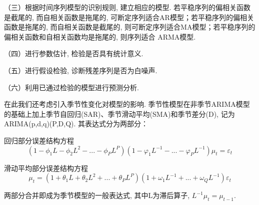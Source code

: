 \documentclass[11pt]{article}
\begin{document}
\qquad （三）根据时间序列模型的识别规则, 建立相应的模型. 若平稳序列的偏相关函数是截尾的, 而自相关函数是拖尾的, 可断定序列适合AR模型；若平稳序列的偏相关函数是拖尾的, 而自相关函数是截尾的, 则可断定序列适合MA模型；若平稳序列的偏相关函数和自相关函数均是拖尾的, 则序列适合 ARMA模型. 

\qquad （四）进行参数估计, 检验是否具有统计意义. 

\qquad （五）进行假设检验, 诊断残差序列是否为白噪声. 

\qquad （六）利用已通过检验的模型进行预测分析. 

\qquad 在此我们还考虑引入季节性变化对模型的影响. 季节性模型在非季节ARIMA模型的基础上加上季节自回归(SAR)、季节滑动平均(SMA)和季节差分(D), 记为ARIMA(p,d,q)(P,D,Q). 其表达式分为两部分：

回归部分误差结构方程
\[(1-\phi_1L-\phi_2L^2-...-\phi_PL^P)(1-\varphi_1L^{-1}-...-\varphi_PL^{-1})\mu_t=\varepsilon_t\]

滑动平均部分误差结构方程\[\mu_t=(1+\theta_1L+\theta_2L^2+...+\theta_PL^P)(1+\omega_1L^{-1}+...+\omega_QL^{-1})\varepsilon_t\]

两部分合并即成为季节模型的一般表达式, 其中L为滞后算子, $L^{-1}\mu_t=\mu_{t-1}$. 
\end{document}

